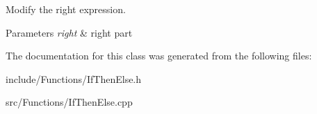 Modify the right expression. 


\begin{DoxyParams}{Parameters}
{\em right} & right part \\
\hline
\end{DoxyParams}


The documentation for this class was generated from the following files\-:\begin{DoxyCompactItemize}
\item 
include/\-Functions/If\-Then\-Else.\-h\item 
src/\-Functions/If\-Then\-Else.\-cpp\end{DoxyCompactItemize}
